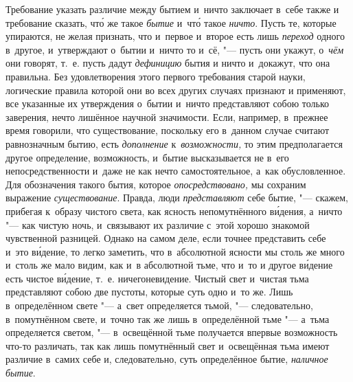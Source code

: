 Требование указать различие между бытием и~ничто заключает в~себе также и
требование сказать, чт\'{о} же такое {\em бытие} и~чт\'{о} такое {\em ничто}.
Пусть те, которые упираются, не желая признать, что и~первое и~второе есть лишь
{\em переход} одного в~другое, и~утверждают о~бытии и~ничто то и~сё, "--- пусть
они укажут, о~{\em чём} они говорят, т.~е. пусть дадут {\em дефиницию} бытия и
ничто и~докажут, что она правильна. Без удовлетворения этого первого требования
старой науки, логические правила которой они во всех других случаях признают и
применяют, все указанные их утверждения о~бытии и~ничто представляют собою
только заверения, нечто лишённое научной значимости. Если, например, в~прежнее
время говорили, что существование, поскольку его в~данном случае считают
равнозначным бытию, есть {\em дополнение} к~{\em возможности,} то этим
предполагается другое определение, возможность, и~бытие высказывается не в~его
непосредственности и~даже не как нечто самостоятельное, а~как обусловленное.
Для обозначения такого бытия, которое {\em опосредствовано,} мы сохраним
выражение {\em существование}. Правда, люди {\em представляют} себе бытие, "---
скажем, прибегая к~образу чистого света, как ясность непомутнённого
в\'{и}дения, а~ничто "--- как чистую ночь, и~связывают их различие с~этой
хорошо знакомой чувственной разницей. Однако на самом деле, если точнее
представить себе и~это в\'{и}дение, то легко заметить, что в~абсолютной ясности
мы столь же много и~столь же мало видим, как и~в абсолютной тьме, что и~то и
другое в\'{и}дение есть чистое в\'{и}дение, т.~е. ничегоневидение. Чистый свет
и~чистая тьма представляют собою две пустоты, которые суть одно и~то же. Лишь
в~определённом свете "--- а~свет определяется тьмой, "--- следовательно,
в~помутнённом свете, и~точно так же лишь в~определённой тьме "--- а~тьма
определяется светом, "--- в~освещённой тьме получается впервые возможность
что-то различать, так как лишь помутнённый свет и~освещённая тьма имеют
различие в~самих себе и, следовательно, суть определённое бытие,
{\em наличное бытие}.


